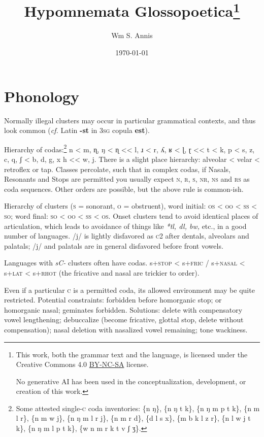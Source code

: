 \documentclass[11pt]{article}
\newcommand{\LL}[1]{\textbf{#1}}  %
\newcommand{\I}[1]{\textsc{#1}}   %
\begin{document}
\frenchspacing
\title{Hypomnemata Glossopoetica\footnote{This work, both the grammar text and the
  language, is licensed under the Creative Commons 4.0
  \href{https://creativecommons.org/licenses/by-nc-sa/4.0/}{BY-NC-SA}
  license.

  No generative AI has been used in the conceptualization,
  development, or creation of this work. 
}}
\author{Wm S. Annis}
\date{\today}
\maketitle

\section{Phonology}

Normally illegal clusters may occur in particular grammatical
contexts, and thus look common (\textit{cf.} Latin \LL{-st} in \I{3sg}
copula \LL{est}).

Hierarchy of codas:\footnote{Some attested single-\I{c} coda
  inventories: \{n ŋ\}, \{n ŋ t k\}, \{n ŋ m p t k\}, \{n m l r\}, \{n
  m w j\}, \{n ŋ m l r j\}, \{n m r d\}, \{d l s x\}, \{m b k l z r\},
  \{n l w j t k\}, \{n ŋ m l p t k\}, \{w n m r k t v ʃ ʒ\}.} n < m,
ɳ, ŋ < ɳ << l, ɹ < r, ʎ, ʁ < ɭ, ɽ << t < k, p < s, z, c, q, ʃ < b, d,
g, x h << w, j.  There is a slight place hierarchy: alveolar < velar <
retroflex or tap.  Classes percolate, such that in complex codas, if
Nasals, Resonants and Stops are permitted you usually expect \I{n, r,
  s, nr, ns} and \I{rs} as coda sequences.  Other orders are possible,
but the above rule is common-ish.

Hierarchy of clusters (\I{s} = sonorant, \I{o} = obstruent), word
initial: \I{os} < \I{oo} < \I{ss} < \I{so}; word final: \I{so} <
\I{oo} < \I{ss} < \I{os}.  Onset clusters tend to avoid identical
places of articulation, which leads to avoidance of things like
\textit{*tl, dl, bw,} etc., in a good number of languages. /j/ is
lightly disfavored as \I{c2} after dentals, alveolars and palatals;
/j/ and palatals are in general disfavored before front vowels.

Languages with \textit{sC-} clusters often have codas.  s+\I{stop} <
s+\I{fric} / s+\I{nasal} < s+\I{lat} < s+\I{rhot} (the fricative and
nasal are trickier to order).

Even if a particular \I{c} is a permitted coda, its allowed
environment may be quite restricted. Potential constraints: forbidden
before homorganic stop; or homorganic nasal; geminates
forbidden. Solutions: delete with compensatory vowel lengthening;
debuccalize (become fricative, glottal stop, delete without
compensation); nasal deletion with nasalized vowel remaining;
tone wackiness.
\end{document}

